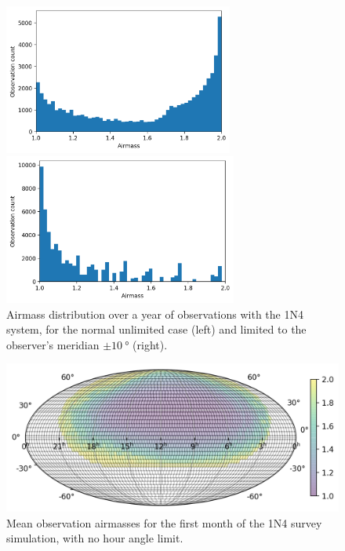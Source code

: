 \begin{colsection}
\begin{figure}[p]
    \begin{center}
        \begin{minipage}[t]{0.49\linewidth}\vspace{10pt}
            \includegraphics[height=140pt]{images/survey_sims/365_1N4_lite_airmass3.png}
        \end{minipage}
        \begin{minipage}[t]{0.49\linewidth}\vspace{10pt}
            \includegraphics[height=140pt]{images/survey_sims/365_1N4_meridian_airmass3.png}
        \end{minipage}
    \end{center}
    \caption[Airmass distribution over a year of observations]{
        Airmass distribution over a year of observations with the 1N4 system, for the normal unlimited case (left) and limited to the observer's meridian $\pm\SI{10}{\degree}$ (right).
    }\label{fig:survey_sim_airmass_365}
\end{figure}

\begin{figure}[p]
    \begin{center}
        \includegraphics[width=0.7\linewidth]{images/survey_sims/30_1N4_lite_airmass.png}
    \end{center}
    \caption[Mean observation airmasses for the 1N4 survey simulation]{
        Mean observation airmasses for the first month of the 1N4 survey simulation, with no hour angle limit.
    }\label{fig:survey_sim_airmass_normal}
\end{figure}


\end{colsection}
